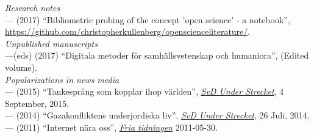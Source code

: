 \documentclass[a4paper,11pt,oneside]{article}
\begin{document}
{  \noindent  \emph{Research notes} \\
    --- (2017) ``Bibliometric probing of the concept 'open science' - a notebook'', \\
    \href{https://github.com/christopherkullenberg/openscienceliterature/}{https://github.com/christopherkullenberg/openscienceliterature/}. \\

 \noindent  \emph{Unpublished manuscripts}  \\
   ---(eds) (2017) ``Digitala metoder för samhällsvetenskap och humaniora'', (Edited volume). \\



  \noindent \emph{Popularizations in news media} \\
    --- (2015) ``Tankesprång som kopplar ihop världen'', \href{http://www.svd.se/tankesprang-som-kopplar-ihop-varlden}{\emph{SvD Under Strecket}}, 4 September, 2015.\\
    --- (2014) ``Gazakonfliktens underjordiska liv'', \href{http://www.svd.se/kultur/understrecket/gazakonfliktens-underjordiska-liv_3776810.svd}{\emph{SvD Under Strecket}}, 26 Juli, 2014.\\
    --- (2011) ``Internet nära oss'', \href{http://www.fria.nu/artikel/88431}{\emph{Fria tidningen}} 2011-05-30.\\

}
\end{document}
